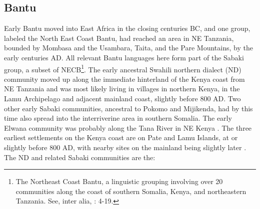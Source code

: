 \documentclass[output=paper
,newtxmath
,modfonts
,nonflat]{langsci/langscibook}
\begin{document}
\subsection{Bantu}\label{sec:nurse:2.3} Early Bantu moved into East Africa in the closing centuries BC, and one group, labeled the North East Coast Bantu, had reached an area in NE Tanzania, bounded by Mombasa and the Usambara, Taita, and the Pare Mountains, by the early centuries AD. All relevant Bantu languages here form part of the Sabaki group, a subset of NECB\footnote{The Northeast Coast Bantu, a linguistic grouping involving  over 20 communities along the coast of southern Somalia, Kenya, and northeastern Tanzania. See, inter alia, \citealt{Nurse1993}: 4-19.}. The early ancestral Swahili northern dialect (ND) community moved up along the immediate hinterland of the Kenya coast from NE Tanzania and was most likely living in villages in northern Kenya, in the Lamu Archipelago and adjacent mainland coast, slightly before 800 AD. Two other early Sabaki communities, ancestral to Pokomo and Mijikenda, had by this time also spread into the interriverine area in southern Somalia. The early Elwana community was probably along the Tana River in NE Kenya \citep[485ff, 499ff]{Nurse1993}. The three earliest settlements on the Kenya coast are on Pate and Lamu Islands, at or slightly before 800 AD, with nearby sites on the mainland being slightly later \citep{Wilson2016}. The ND and related Sabaki communities are the: 
\end{document}
